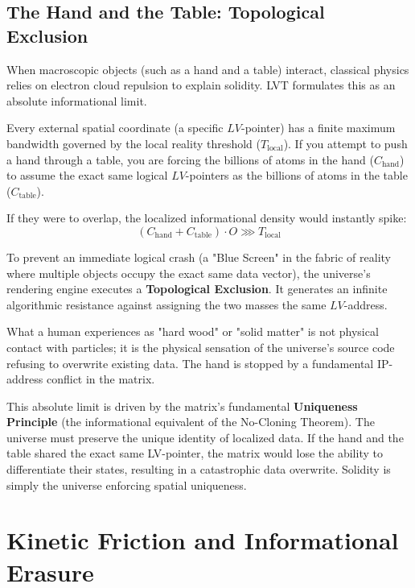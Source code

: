 \documentclass[12pt,a4paper]{article}
\begin{document}
\subsection{The Hand and the Table: Topological Exclusion}
When macroscopic objects (such as a hand and a table) interact, classical physics relies on electron cloud repulsion to explain solidity. LVT formulates this as an absolute informational limit.

Every external spatial coordinate (a specific $LV$-pointer) has a finite maximum bandwidth governed by the local reality threshold ($T_{\mathrm{local}}$). If you attempt to push a hand through a table, you are forcing the billions of atoms in the hand ($C_{\mathrm{hand}}$) to assume the exact same logical $LV$-pointers as the billions of atoms in the table ($C_{\mathrm{table}}$). 

If they were to overlap, the localized informational density would instantly spike:
\begin{equation}
(C_{\mathrm{hand}} + C_{\mathrm{table}}) \cdot O \ggg T_{\mathrm{local}}
\end{equation}

To prevent an immediate logical crash (a "Blue Screen" in the fabric of reality where multiple objects occupy the exact same data vector), the universe's rendering engine executes a \textbf{Topological Exclusion}. It generates an infinite algorithmic resistance against assigning the two masses the same $LV$-address. 



What a human experiences as "hard wood" or "solid matter" is not physical contact with particles; it is the physical sensation of the universe's source code refusing to overwrite existing data. The hand is stopped by a fundamental IP-address conflict in the matrix.

This absolute limit is driven by the matrix's fundamental \textbf{Uniqueness Principle} (the informational equivalent of the No-Cloning Theorem). The universe must preserve the unique identity of localized data. If the hand and the table shared the exact same LV-pointer, the matrix would lose the ability to differentiate their states, resulting in a catastrophic data overwrite. Solidity is simply the universe enforcing spatial uniqueness.

\section{Kinetic Friction and Informational Erasure}
\end{document}
